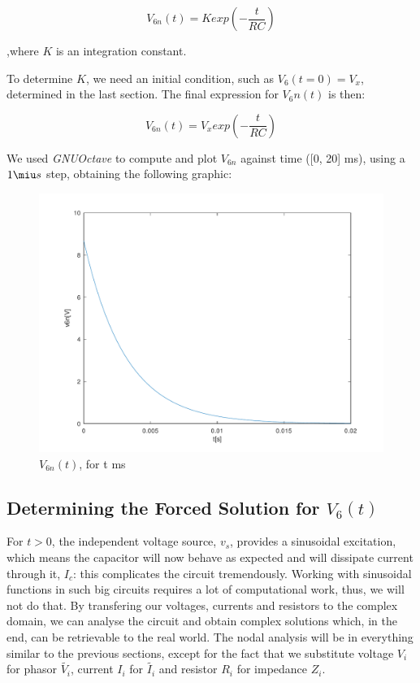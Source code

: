 
\begin{center}
  \begin{equation}
    V_{6n}(t) = K exp\left(-\frac{t}{RC}\right)
  \end{equation} 
\end{center}


,where $K$ is an integration constant.

To determine $K$, we need an initial condition, such as $V_6(t=0) = V_x$, determined in the last section. The final expression for $V_6n(t)$ is then:

\begin{center}
  \begin{equation}
    V_{6n}(t) = V_x exp\left(-\frac{t}{RC}\right)
  \end{equation} 
\end{center}



We used \textit{GNUOctave} to compute and plot $V_{6n}$ against time ([0, 20] ms), using a $1\miu s$ step, obtaining the following graphic:


\begin{figure}[h] \centering
\includegraphics[width=0.4\linewidth]{../mat/t2-t3.pdf}
\caption{$V_{6n}(t)$, for t \in [0, 20] ms}
\label{fig4}
\end{figure}


\subsection{Determining the Forced Solution for $V_6(t)$}

For $t>0$, the independent voltage source, $v_s$, provides a sinusoidal excitation, which means the capacitor will now behave as expected and will dissipate current through it, $I_c$: this complicates the circuit tremendously. Working with sinusoidal functions in such big circuits requires a lot of computational work, thus, we will not do that. By transfering our voltages, currents and resistors to the complex domain, we can analyse the circuit and obtain complex solutions which, in the end, can be retrievable to the real world. The nodal analysis will be in everything similar to the previous sections, except for the fact that we substitute voltage $V_i$ for phasor $\tilde{V_i}$, current $I_i$ for $\tilde{I_i}$ and resistor $R_i$ for impedance $Z_i$.

